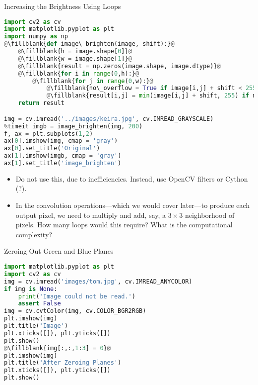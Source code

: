 \begin{frame}{Increasing the Brightness Using Loops}
    \begin{lstlisting}[caption=Increasing the Brightness Using Loops, language=Python, escapechar=\@]
import cv2 as cv
import matplotlib.pyplot as plt
import numpy as np
@\fillblank{def image\_brighten(image, shift):}@
    @\fillblank{h = image.shape[0]}@
    @\fillblank{w = image.shape[1]}@
    @\fillblank{result = np.zeros(image.shape, image.dtype)}@
    @\fillblank{for i in range(0,h):}@
        @\fillblank{for j in range(0,w):}@
            @\fillblank{no\_overflow = True if image[i,j] + shift < 255 else False}@
            @\fillblank{result[i,j] = min(image[i,j] + shift, 255) if no\_overflow else 255}@
    return result

img = cv.imread('../images/keira.jpg', cv.IMREAD_GRAYSCALE)
%timeit imgb = image_brighten(img, 200)
f, ax = plt.subplots(1,2)
ax[0].imshow(img, cmap = 'gray')
ax[0].set_title('Original')
ax[1].imshow(imgb, cmap = 'gray')
ax[1].set_title('image_brighten')
    \end{lstlisting}
\begin{itemize}
    \item Do not use this, due to inefficiencies. Instead, use OpenCV filters or Cython (?).
    \item In the convolution operations---which we would cover later---to produce each output pixel, we need to multiply and add, say, a $3\times 3$ neighborhood of pixels. How many loops would this require? What is the computational complexity?
\end{itemize}
\end{frame}


\begin{frame}[t, fragile]{Zeroing Out Green and Blue Planes}
    \begin{lstlisting}[caption=Zeroing Out Green and Blue Planes, language=Python, escapechar=\@]
%matplotlib inline
import matplotlib.pyplot as plt
import cv2 as cv
img = cv.imread('images/tom.jpg', cv.IMREAD_ANYCOLOR)
if img is None:
    print('Image could not be read.')
    assert False
img = cv.cvtColor(img, cv.COLOR_BGR2RGB)
plt.imshow(img)
plt.title('Image')
plt.xticks([]), plt.yticks([])
plt.show()
@\fillblank{img[:,:,1:3] = 0}@
plt.imshow(img)
plt.title('After Zeroing Planes')
plt.xticks([]), plt.yticks([])
plt.show()
    \end{lstlisting}


\end{frame}


